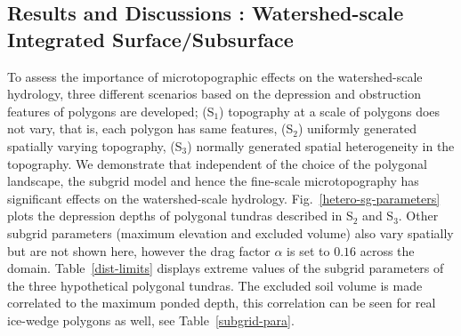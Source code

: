 \documentclass[review,11pt]{elsarticle}
\begin{document}
\subsection{Results and Discussions : Watershed-scale Integrated Surface/Subsurface}
To assess the importance of microtopographic effects on the watershed-scale hydrology, three different scenarios based on the depression and obstruction features of polygons are developed; (S$_1$) topography at a scale of polygons does not vary, that is, each polygon has same features, (S$_2$) uniformly generated spatially varying topography, (S$_3$) normally generated spatial heterogeneity in the topography.  
We demonstrate that independent of the choice of the polygonal landscape, the subgrid model and hence the fine-scale microtopography has significant effects on the watershed-scale hydrology. Fig.~\ref{hetero-sg-parameters} plots the depression depths of polygonal tundras described in S$_2$ and S$_3$. Other subgrid parameters (maximum elevation and excluded volume) also vary spatially but are not shown here, however the drag factor $\alpha$ is set to $0.16$ across the domain. Table~\ref{dist-limits} displays extreme values of the subgrid parameters of the three hypothetical polygonal tundras. The excluded soil volume is made correlated to the maximum ponded depth, this correlation can be seen for real ice-wedge polygons as well, see Table~\ref{subgrid-para}. 
\end{document}
